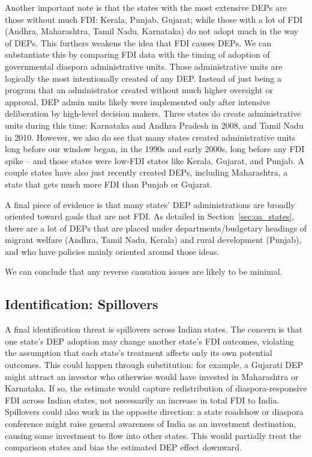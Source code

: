 \documentclass[12pt]{article}
\let\oldsubsection\subsection
\renewcommand{\subsection}{\FloatBarrier\oldsubsection}
\begin{document}
Another important note is that the states with the most extensive DEPs are those without much FDI: Kerala, Punjab, Gujarat; while those with a lot of FDI (Andhra, Maharashtra, Tamil Nadu, Karnataka) do not adopt much in the way of DEPs. This furthers weakens the idea that FDI causes DEPs.
We can substantiate this by comparing FDI data with the timing of adoption of governmental diaspora administrative units. Those administrative units are logically the most intentionally created of any DEP. Instead of just being a program that an administrator created without much higher oversight or approval, DEP admin units likely were implemented only after intensive deliberation by high-level decision makers. Three states do create administrative units during this time: Karnataka and Andhra Pradesh in 2008,  and Tamil Nadu in 2010. However, we also do see that many states created administrative units long before our window began, in the 1990s and early 2000s, long before any FDI spike -- and those states were low-FDI states like Kerala, Gujarat, and Punjab. A couple states have also just recently created DEPs, including Maharashtra, a state that gets much more FDI than Punjab or Gujarat. 

A final piece of evidence is that many states' DEP administrations are broadly oriented toward goals that are not FDI. As detailed in Section~\ref{sec:oa_states}, there are a lot of DEPs that are placed under departments/budgetary headings of migrant welfare (Andhra, Tamil Nadu, Kerala) and rural development (Punjab), and who have policies mainly oriented around those ideas. 

We can conclude that any reverse causation issues are likely to be minimal.


\subsection{Identification: Spillovers} \label{ss:spillovers}

A final identification threat is spillovers across Indian states. The concern is that one state's DEP adoption may change another state's FDI outcomes, violating the assumption that each state's treatment affects only its own potential outcomes. This could happen through substitution: for example, a Gujarati DEP might attract an investor who otherwise would have invested in Maharashtra or Karnataka. If so, the estimate would capture redistribution of diaspora-responsive FDI across Indian states, not necessarily an increase in total FDI to India. Spillovers could also work in the opposite direction: a state roadshow or diaspora conference might raise general awareness of India as an investment destination, causing some investment to flow into other states. This would partially treat the comparison states and bias the estimated DEP effect downward.
\end{document}
